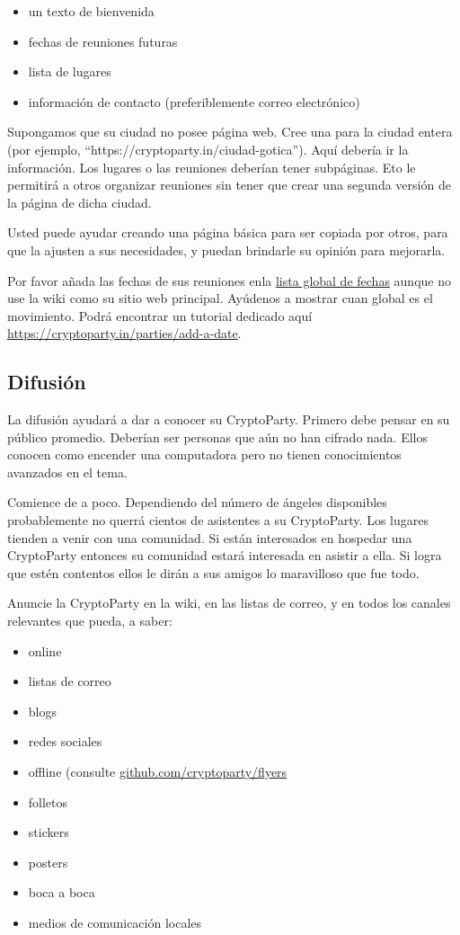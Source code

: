 \documentclass[10pt,a5paper,twoside,,]{book}
\providecommand{\tightlist}{%
  \setlength{\itemsep}{0pt}\setlength{\parskip}{0pt}}
\begin{document}
\begin{itemize}
\tightlist
\item
  un texto de bienvenida
\item
  fechas de reuniones futuras
\item
  lista de lugares
\item
  información de contacto (preferiblemente correo electrónico)
\end{itemize}

Supongamos que su ciudad no posee página web. Cree una para la ciudad
entera (por ejemplo, ``https://cryptoparty.in/ciudad-gotica''). Aquí
debería ir la información. Los lugares o las reuniones deberían tener
subpáginas. Eto le permitirá a otros organizar reuniones sin tener que
crear una segunda versión de la página de dicha ciudad.

Usted puede ayudar creando una página básica para ser copiada por otros,
para que la ajusten a sus necesidades, y puedan brindarle su opinión
para mejorarla.

Por favor añada las fechas de sus reuniones enla
\href{https://cryptoparty.in/parties/upcoming}{lista global de fechas}
aunque no use la wiki como su sitio web principal. Ayúdenos a mostrar
cuan global es el movimiento. Podrá encontrar un tutorial dedicado aquí
\url{https://cryptoparty.in/parties/add-a-date}.

\subsection{Difusión}\label{difusiuxf3n}

La difusión ayudará a dar a conocer su CryptoParty. Primero debe pensar
en su público promedio. Deberían ser personas que aún no han cifrado
nada. Ellos conocen como encender una computadora pero no tienen
conocimientos avanzados en el tema.

Comience de a poco. Dependiendo del número de ángeles disponibles
probablemente no querrá cientos de asistentes a su CryptoParty. Los
lugares tienden a venir con una comunidad. Si están interesados en
hospedar una CryptoParty entonces su comunidad estará interesada en
asistir a ella. Si logra que estén contentos ellos le dirán a sus amigos
lo maravilloso que fue todo.

Anuncie la CryptoParty en la wiki, en las listas de correo, y en todos
los canales relevantes que pueda, a saber:

\begin{itemize}
\tightlist
\item
  online
\item
  listas de correo
\item
  blogs
\item
  redes sociales
\item
  offline (consulte
  \href{https://github.com/cryptoparty/flyers}{github.com/cryptoparty/flyers}
\item
  folletos
\item
  stickers
\item
  posters
\item
  boca a boca
\item
  medios de comunicación locales
\end{itemize}
\end{document}
